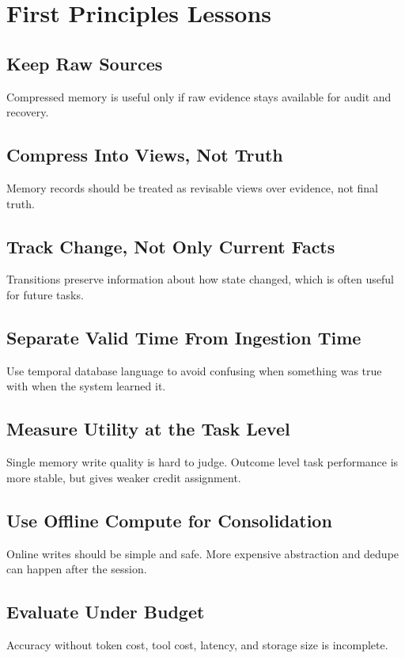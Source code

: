 \documentclass[11pt]{article}
\begin{document}
\section{First Principles Lessons}

\subsection{Keep Raw Sources}
Compressed memory is useful only if raw evidence stays available for audit and recovery.

\subsection{Compress Into Views, Not Truth}
Memory records should be treated as revisable views over evidence, not final truth.

\subsection{Track Change, Not Only Current Facts}
Transitions preserve information about how state changed, which is often useful for future tasks.

\subsection{Separate Valid Time From Ingestion Time}
Use temporal database language to avoid confusing when something was true with when the system learned it.

\subsection{Measure Utility at the Task Level}
Single memory write quality is hard to judge. Outcome level task performance is more stable, but gives weaker credit assignment.

\subsection{Use Offline Compute for Consolidation}
Online writes should be simple and safe. More expensive abstraction and dedupe can happen after the session.

\subsection{Evaluate Under Budget}
Accuracy without token cost, tool cost, latency, and storage size is incomplete.
\end{document}
